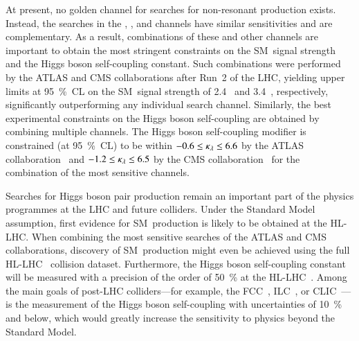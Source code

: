 At present, no golden channel for searches for non-resonant \HH production
exists. Instead, the searches in the \bbbb, \bbtautau, and \bbyy channels have
similar sensitivities and are complementary. As a result, combinations of these
and other channels are important to obtain the most stringent constraints on the
SM~\HH signal strength and the Higgs boson self-coupling constant. Such
combinations were performed by the ATLAS and CMS collaborations after Run~2 of
the LHC, yielding upper limits at \SI{95}{\percent}~CL on the SM~\HH signal
strength of 2.4~\cite{HDBS-2022-03} and 3.4~\cite{CMS-HIG-22-001}, respectively,
significantly outperforming any individual search channel. Similarly, the best
experimental constraints on the Higgs boson self-coupling are obtained by
combining multiple channels. The Higgs boson self-coupling modifier is
constrained (at \SI{95}{\percent}~CL) to be within $-0.6 \leq \kappa_{\lambda} \leq 6.6$
by the ATLAS collaboration~\cite{HDBS-2022-03} and $-1.2 \leq \kappa_{\lambda} \leq 6.5$
by the CMS collaboration~\cite{CMS-HIG-22-001} for the combination of the most
sensitive channels.


Searches for Higgs boson pair production remain an important part of the physics
programmes at the LHC and future colliders. Under the Standard Model assumption,
first evidence for SM~\HH production is likely to be obtained at the
HL-LHC. When combining the most sensitive searches of the ATLAS and CMS
collaborations, discovery of SM~\HH production might even be achieved using the
full HL-LHC \pp~collision dataset. Furthermore, the Higgs boson self-coupling
constant will be measured with a precision of the order of \SI{50}{\percent} at
the HL-LHC~\cite{DiMicco:2019ngk}. Among the main goals of post-LHC
colliders---for example, the FCC~\cite{FCC:2018byv}, ILC~\cite{Bambade:2019fyw},
or CLIC~\cite{CLIC:2018fvx}---is the measurement of the Higgs boson
self-coupling with uncertainties of \SI{10}{\percent} and below, which would
greatly increase the sensitivity to physics beyond the Standard Model.



